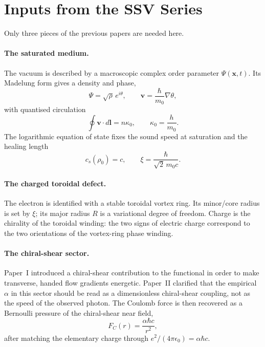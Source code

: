 \documentclass[11pt,a4paper]{article}
\newcommand{\mzero}{m_0}
\begin{document}
\section{Inputs from the SSV Series}
\label{sec:inputs}

Only three pieces of the previous papers are needed here.

\paragraph{The saturated medium.}
The vacuum is described by a macroscopic complex order parameter
$\Psi(\mathbf{x},t)$.  Its Madelung form gives a density and phase,
\[
    \Psi = \sqrt{\rho}\,e^{i\theta},
    \qquad
    \mathbf{v} = \frac{\hbar}{\mzero}\nabla\theta ,
\]
with quantised circulation
\begin{equation}
    \oint \mathbf{v}\cdot d\mathbf{l}
    = n\kappa_0,
    \qquad
    \kappa_0 = \frac{h}{\mzero}.
    \label{eq:circulation}
\end{equation}
The logarithmic equation of state fixes the sound speed at saturation and
the healing length
\begin{equation}
    c_s(\rho_0)=c,
    \qquad
    \xi = \frac{\hbar}{\sqrt2\,\mzero c}.
    \label{eq:xi}
\end{equation}

\paragraph{The charged toroidal defect.}
The electron is identified with a stable toroidal vortex ring.  Its
minor/core radius is set by $\xi$; its major radius $R$ is a variational
degree of freedom.  Charge is the chirality of the toroidal winding: the
two signs of electric charge correspond to the two orientations of the
vortex-ring phase winding.

\paragraph{The chiral-shear sector.}
Paper~I introduced a chiral-shear contribution to the functional in order
to make transverse, handed flow gradients energetic.  Paper~II clarified
that the empirical $\alpha$ in this sector should be read as a
dimensionless chiral-shear coupling, not as the speed of the observed
photon.  The Coulomb force is then recovered as a Bernoulli pressure of the
chiral-shear near field,
\begin{equation}
    F_C(r) = \frac{\alpha\hbar c}{r^2},
    \label{eq:coulomb_ssv}
\end{equation}
after matching the elementary charge through
$e^2/(4\pi\epsilon_0)=\alpha\hbar c$.
\end{document}
